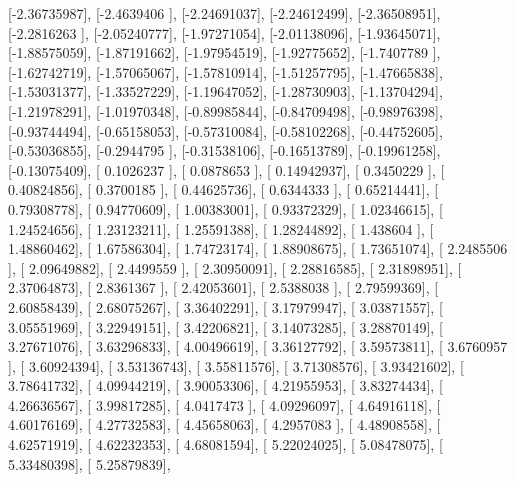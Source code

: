 \documentclass{article}
\begin{document}
       [-2.36735987],
       [-2.4639406 ],
       [-2.24691037],
       [-2.24612499],
       [-2.36508951],
       [-2.2816263 ],
       [-2.05240777],
       [-1.97271054],
       [-2.01138096],
       [-1.93645071],
       [-1.88575059],
       [-1.87191662],
       [-1.97954519],
       [-1.92775652],
       [-1.7407789 ],
       [-1.62742719],
       [-1.57065067],
       [-1.57810914],
       [-1.51257795],
       [-1.47665838],
       [-1.53031377],
       [-1.33527229],
       [-1.19647052],
       [-1.28730903],
       [-1.13704294],
       [-1.21978291],
       [-1.01970348],
       [-0.89985844],
       [-0.84709498],
       [-0.98976398],
       [-0.93744494],
       [-0.65158053],
       [-0.57310084],
       [-0.58102268],
       [-0.44752605],
       [-0.53036855],
       [-0.2944795 ],
       [-0.31538106],
       [-0.16513789],
       [-0.19961258],
       [-0.13075409],
       [ 0.1026237 ],
       [ 0.0878653 ],
       [ 0.14942937],
       [ 0.3450229 ],
       [ 0.40824856],
       [ 0.3700185 ],
       [ 0.44625736],
       [ 0.6344333 ],
       [ 0.65214441],
       [ 0.79308778],
       [ 0.94770609],
       [ 1.00383001],
       [ 0.93372329],
       [ 1.02346615],
       [ 1.24524656],
       [ 1.23123211],
       [ 1.25591388],
       [ 1.28244892],
       [ 1.438604  ],
       [ 1.48860462],
       [ 1.67586304],
       [ 1.74723174],
       [ 1.88908675],
       [ 1.73651074],
       [ 2.2485506 ],
       [ 2.09649882],
       [ 2.4499559 ],
       [ 2.30950091],
       [ 2.28816585],
       [ 2.31898951],
       [ 2.37064873],
       [ 2.8361367 ],
       [ 2.42053601],
       [ 2.5388038 ],
       [ 2.79599369],
       [ 2.60858439],
       [ 2.68075267],
       [ 3.36402291],
       [ 3.17979947],
       [ 3.03871557],
       [ 3.05551969],
       [ 3.22949151],
       [ 3.42206821],
       [ 3.14073285],
       [ 3.28870149],
       [ 3.27671076],
       [ 3.63296833],
       [ 4.00496619],
       [ 3.36127792],
       [ 3.59573811],
       [ 3.6760957 ],
       [ 3.60924394],
       [ 3.53136743],
       [ 3.55811576],
       [ 3.71308576],
       [ 3.93421602],
       [ 3.78641732],
       [ 4.09944219],
       [ 3.90053306],
       [ 4.21955953],
       [ 3.83274434],
       [ 4.26636567],
       [ 3.99817285],
       [ 4.0417473 ],
       [ 4.09296097],
       [ 4.64916118],
       [ 4.60176169],
       [ 4.27732583],
       [ 4.45658063],
       [ 4.2957083 ],
       [ 4.48908558],
       [ 4.62571919],
       [ 4.62232353],
       [ 4.68081594],
       [ 5.22024025],
       [ 5.08478075],
       [ 5.33480398],
       [ 5.25879839],
\end{document}
